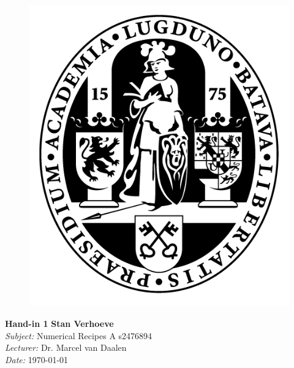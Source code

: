 \documentclass[hidelinks,a4paper,11pt]{article}
\begin{document}
\begin{figure}
	\includegraphics[]{UL.png}
\end{figure}
\noindent
\Large\textbf{Hand-in 1} \hspace*{\fill} \normalsize\textbf{Stan Verhoeve}\\
\textit{Subject:} Numerical Recipes A \hspace*{\fill}s2476894\\
\textit{Lecturer:} Dr. Marcel van Daalen\\
\textit{Date:} \today

\vspace*{15mm}
\noindent


\end{document}
